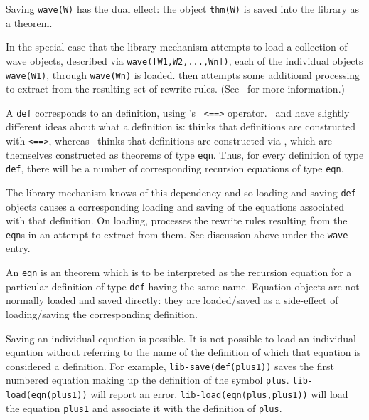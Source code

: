 \begin{description}
Saving {\tt wave(W)} has the dual effect: the object {\tt thm(W)} is
saved into the library as a theorem.

In the special case that the library mechanism attempts to load a
collection of wave objects, described via {\tt wave([W1,W2,...,Wn])},
each of the individual objects {\tt wave(W1)}, through {\tt wave(Wn)} is
loaded. \clam then attempts some additional processing to extract
 from the resulting set of rewrite
rules. (See~ for more
information.)

\item[{\tt \inxtt{def}}:]
A {\tt def} corresponds to an \oyster
definition, using \oyster's {\tt
<==>} operator. \clam\ and \oyster have
slightly different ideas about what a definition is: \oyster thinks
that definitions are constructed with {\tt <==>}, whereas \clam\
thinks that definitions are constructed via , which are themselves constructed
as \oyster theorems of type {\tt eqn}. Thus, for every definition of
type {\tt def}, there will be a number of corresponding recursion
equations of type {\tt eqn}.

The library mechanism knows of this dependency and so loading and
saving {\tt def} objects causes a corresponding loading and saving of
the equations associated with that definition.  On loading, \clam
processes the rewrite rules resulting from the {\tt eqn}s in an
attempt to extract  from them.  See discussion above under the {\tt wave} entry.

\item[{\tt \inxtt{eqn}}:]
An {\tt eqn} is an \oyster theorem
which is to be interpreted as the recursion equation for a particular
definition of type {\tt def} having the same name.  Equation objects
are not normally loaded and saved directly: they are loaded/saved as a
side-effect of loading/saving the corresponding definition.

Saving an individual equation is possible.  It is not possible to load
an individual equation without referring to the name of the definition
of which that equation is considered a definition.  For example, {\tt lib-save(def(plus1))} saves the first numbered equation making up the definition of the symbol {\tt plus}.  {\tt lib-load(eqn(plus1))} will report an error.  {\tt lib-load(eqn(plus,plus1))}  will load the equation {\tt plus1} and associate it with the definition of {\tt plus}.


\end{description}
